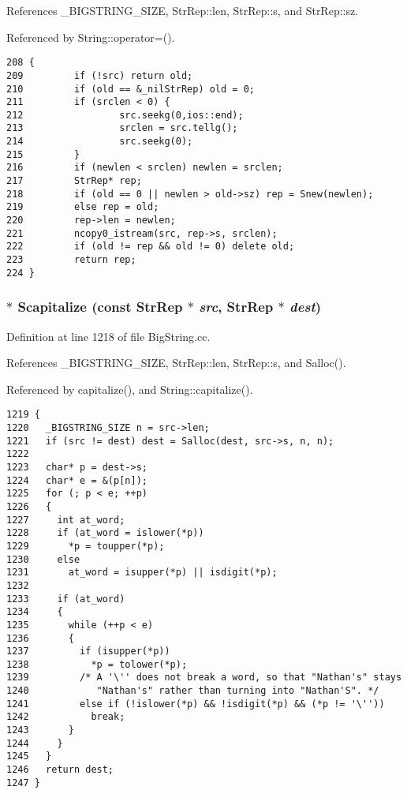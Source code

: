 References \_\-BIGSTRING\_\-SIZE, Str\-Rep::len, Str\-Rep::s, and Str\-Rep::sz.

Referenced by String::operator=().



\footnotesize\begin{verbatim}208 {
209         if (!src) return old;
210         if (old == &_nilStrRep) old = 0;
211         if (srclen < 0) {
212                 src.seekg(0,ios::end);
213                 srclen = src.tellg();
214                 src.seekg(0);
215         }
216         if (newlen < srclen) newlen = srclen;
217         StrRep* rep;
218         if (old == 0 || newlen > old->sz) rep = Snew(newlen);
219         else rep = old;
220         rep->len = newlen;
221         ncopy0_istream(src, rep->s, srclen);
222         if (old != rep && old != 0) delete old;
223         return rep;
224 }
\end{verbatim}\normalsize 
{}
\subsubsection{$\ast$ Scapitalize (const {\bf Str\-Rep} $\ast$ {\em src}, {\bf Str\-Rep} $\ast$ {\em dest})}\label{BigString_8cc_a37}




Definition at line 1218 of file Big\-String.cc.

References \_\-BIGSTRING\_\-SIZE, Str\-Rep::len, Str\-Rep::s, and Salloc().

Referenced by capitalize(), and String::capitalize().



\footnotesize\begin{verbatim}1219 {
1220   _BIGSTRING_SIZE n = src->len;
1221   if (src != dest) dest = Salloc(dest, src->s, n, n);
1222 
1223   char* p = dest->s;
1224   char* e = &(p[n]);
1225   for (; p < e; ++p)
1226   {
1227     int at_word;
1228     if (at_word = islower(*p))
1229       *p = toupper(*p);
1230     else 
1231       at_word = isupper(*p) || isdigit(*p);
1232 
1233     if (at_word)
1234     {
1235       while (++p < e)
1236       {
1237         if (isupper(*p))
1238           *p = tolower(*p);
1239         /* A '\'' does not break a word, so that "Nathan's" stays
1240            "Nathan's" rather than turning into "Nathan'S". */
1241         else if (!islower(*p) && !isdigit(*p) && (*p != '\''))
1242           break;
1243       }
1244     }
1245   }
1246   return dest;
1247 }
\end{verbatim}\normalsize 
{}
